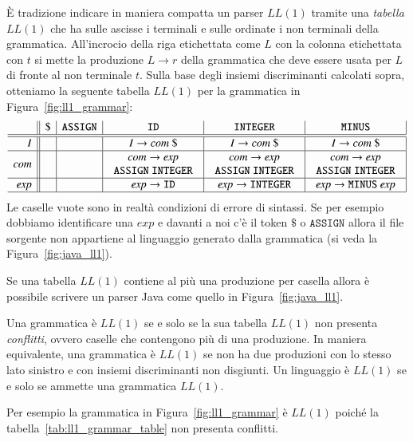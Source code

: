\`E tradizione indicare in maniera compatta un parser $\mathit{LL}(1)$ tramite
una \emph{tabella $\mathit{LL}(1)$} che ha sulle ascisse i terminali
e sulle ordinate i non terminali della grammatica. All'incrocio della
riga etichettata come $L$ con la colonna etichettata con $t$ si mette
la produzione $L\to r$ della grammatica che deve essere usata per $L$
di fronte al non terminale $t$.
Sulla base degli insiemi discriminanti calcolati sopra, otteniamo la seguente
tabella $\mathit{LL}(1)$
per la grammatica in Figura~\ref{fig:ll1_grammar}:
%
\begin{equation}\label{tab:ll1_grammar_table}
\begin{array}{r||c|c|c|c|c|}
 & \mathtt{\$} & \mathtt{ASSIGN} & \mathtt{ID} & \mathtt{INTEGER} & \mathtt{MINUS}\\\hline\hline
\mathit{I} & & & I\to\mathit{com}\ \$ & I\to\mathit{com}\ \$ &
  I\to\mathit{com}\ \$ \\\hline
\mathit{com} & & & \begin{array}{c}\mathit{com}\to\mathit{exp}\\\mathtt{ASSIGN}\ \mathtt{INTEGER}\end{array} & \begin{array}{c}\mathit{com}\to\mathit{exp}\\\mathtt{ASSIGN}\ \mathtt{INTEGER}\end{array} & \begin{array}{c}\mathit{com}\to\mathit{exp}\\\mathtt{ASSIGN}\ \mathtt{INTEGER}\end{array}\\\hline
\mathit{exp} & & & \mathit{exp}\to\mathtt{ID} &
  \mathit{exp}\to\mathtt{INTEGER} & \mathit{exp}\to\mathtt{MINUS}\ \mathit{exp}
\\\hline
\end{array}
\end{equation}
%
Le caselle vuote sono in realt\`a condizioni di errore di sintassi. Se
per esempio dobbiamo identificare una $\mathit{exp}$ e davanti a noi
c'\`e il token $\mathtt{\$}$ o $\mathtt{ASSIGN}$ allora il file sorgente
non appartiene al linguaggio generato dalla grammatica
(si veda la Figura~\ref{fig:java_ll1}).

Se una tabella $\mathit{LL}(1)$
contiene al pi\`u una produzione per casella allora
\`e possibile scrivere un parser Java come quello in Figura~\ref{fig:java_ll1}.
%
\begin{definition}\label{def:ll1_grammar}
Una grammatica \`e $\mathit{LL}(1)$
se e solo se la sua tabella $\mathit{LL}(1)$ non presenta
\emph{conflitti}, ovvero caselle che contengono pi\`u di una produzione.
In maniera equivalente, una grammatica \`e $\mathit{LL}(1)$ se non ha due
produzioni con lo stesso lato sinistro e con
insiemi discriminanti non disgiunti.
Un linguaggio \`e $\mathit{LL}(1)$ se e solo se ammette una grammatica
$\mathit{LL}(1)$.
\end{definition}
%
\noindent
Per esempio la grammatica in Figura~\ref{fig:ll1_grammar} \`e $\mathit{LL}(1)$
poich\'e la tabella~\eqref{tab:ll1_grammar_table} non presenta conflitti.

